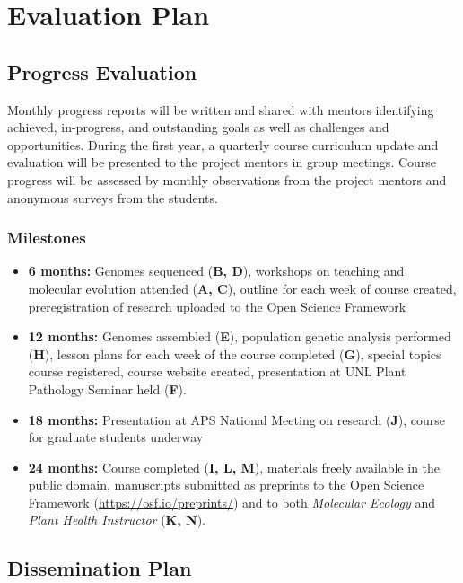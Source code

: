 \documentclass[12pt,letterpaper]{article}
\begin{document}

\section{Evaluation Plan}

\subsection{Progress Evaluation}

Monthly progress reports will be written and shared with mentors identifying achieved, in-progress, and outstanding goals as well as challenges and opportunities. During the first year, a quarterly course curriculum update and evaluation will be presented to the project mentors in group meetings. Course progress will be assessed by monthly observations from the project mentors and anonymous surveys from the students. 

\subsubsection{Milestones}
\begin{itemize}
  \item \textbf{6 months:} Genomes sequenced (\textbf{B, D}), workshops on teaching and molecular evolution attended (\textbf{A, C}), outline for each week of course created, preregistration of research uploaded to the Open Science Framework
  \item \textbf{12 months:} Genomes assembled (\textbf{E}), population genetic analysis performed (\textbf{H}), lesson plans for each week of the course completed (\textbf{G}), special topics course registered, course website created, presentation at UNL Plant Pathology Seminar held (\textbf{F}).
  \item \textbf{18 months:} Presentation at APS National Meeting on research (\textbf{J}), course for graduate students underway
  \item \textbf{24 months:} Course completed (\textbf{I, L, M}), materials freely available in the public domain, manuscripts submitted as preprints to the Open Science Framework (\url{https://osf.io/preprints/}) and to both \textit{Molecular Ecology} and \textit{Plant Health Instructor} (\textbf{K, N}).
\end{itemize}

\subsection{Dissemination Plan}
\end{document}
